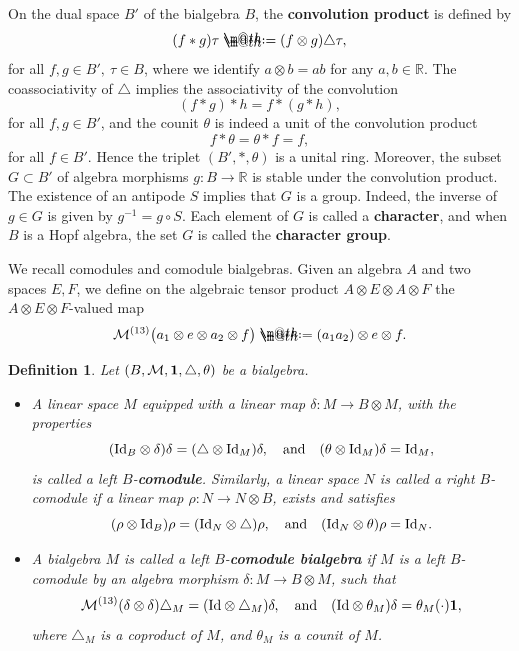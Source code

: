 \documentclass[10pt, reqno]{amsart}
\makeatletter
\numberwithin{subsection}{section}
\numberwithin{subsubsection}{subsection}
\numberwithin{equation}{section} %
\theoremstyle{mystyle}
\theoremstyle{mystyle2}
\newtheorem*{defn*} {Definition}
\theoremstyle{mystyle3}
\newcommand{\iden}{\text{\rm Id}}
\newcommand\bbR{\mathbb{R}}
\newcommand{\mcM}{\mathcal{M}}
\newcommand*{\defeq}{\mathrel{\rlap{%
                     \raisebox{0.3ex}{$\m@th\cdot$}}%
                     \raisebox{-0.3ex}{$\m@th\cdot$}}%
                     =}
\makeatother
\begin{document}
\medskip

On the dual space $B'$ of the bialgebra $B$, the \textbf{\textsf{convolution product}} is defined by
$$
(f*g)\tau \defeq  (f\otimes g)\triangle\tau,
$$
for all $f,g\in B',\ \tau\in B$, where we identify $a\otimes b=ab$ for any $a,b\in\bbR$. The coassociativity of $\triangle$ implies the associativity of the convolution
$$
(f*g)*h=f*(g*h),
$$
for all $f,g\in B'$, and the counit $\theta$ is indeed a unit of the convolution product
$$
f*\theta = \theta*f=f,
$$
for all $f\in B'$. Hence the triplet $(B',*,\theta)$ is a unital ring. Moreover, the subset $G\subset B'$ of algebra morphisms $g:B\to\bbR$ is stable under the convolution product. The existence of an antipode $S$ implies that $G$ is a group. Indeed, the inverse of $g\in G$ is given by $g^{-1}=g\circ S$. Each element of $G$ is called a \textbf{\textsf{character}}, and when $B$ is a Hopf algebra, the set $G$ is called the \textbf{\textsf{character group}}.

\medskip

We recall comodules and comodule bialgebras.
Given an algebra $A$ and two spaces $E,F$, we define on the algebraic tensor product $A\otimes E\otimes A\otimes F$ the $A\otimes E\otimes F$-valued map
$$
\mcM^{(13)}\big(a_1\otimes e\otimes a_2\otimes f\big) \defeq  (a_1a_2)\otimes e\otimes f.
$$

\begin{defn*}
Let $(B,\mcM,{\bf1},\triangle,\theta)$ be a bialgebra.
\begin{itemize}
\item A linear space $M$ equipped with a linear map $\delta:M\to B\otimes 
M$, with the properties
$$
(\text{\rm Id}_B\otimes\delta)\delta=(\triangle\otimes\text{\rm Id}_M)\delta,\quad\textrm{and}\quad
(\theta\otimes\iden_M)\delta=\iden_M,
$$
is called a left $B$-\textbf{\textsf{comodule}}.
Similarly, a linear space $N$ is called a right $B$-comodule if a linear map $\rho:N\to N\otimes B$, exists and satisfies
$$
(\rho\otimes\iden_B)\rho = (\iden_N\otimes\triangle)\rho,\quad\textrm{and}\quad (\iden_N\otimes\theta)\rho = \iden_N.
$$
\item A bialgebra $M$ is called a left $B$-\textbf{\textsf{comodule bialgebra}} if $M$ is a left $B$-comodule by an algebra morphism $\delta:M\to B\otimes M$, such that
$$
\mcM^{(13)}(\delta\otimes\delta)\triangle_M=(\text{\rm Id}\otimes\triangle_M)\delta,\quad\textrm{and}\quad
(\text{\rm Id}\otimes\theta_M)\delta = \theta_M(\cdot){\bf1},
$$
where $\triangle_M$ is a coproduct of $M$, and $\theta_M$ is a counit of $M$.
\end{itemize}
\end{defn*}
\end{document}
